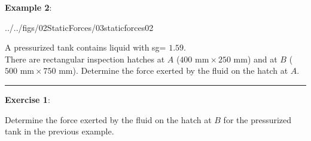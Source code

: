 \documentclass[10pt,onesided]{amsart}
\begin{document}
\begin{minipage}[t]{0.5\textwidth}
	\raggedright
	\textbf{Example 2}:\parb
	\parb
	\begin{cfig}[0.45]{../../figs/02StaticForces/03staticforces02}\end{cfig}
	A pressurized tank contains liquid with sg= $1.59$. \\
	There are rectangular inspection hatches at $A$ ($400\text{ mm}\times 250\text{ mm}$) and at $B$ ($500\text{ mm}\times 750\text{ mm}$).
	\parb
	Determine the force exerted by the fluid on the hatch at $A$.
	\vspace{4cm}
\end{minipage}
\parb
\rule{\textwidth}{0.02in}
\parb

\begin{minipage}[t]{0.5\textwidth}
	\raggedright
	\textbf{Exercise 1}:\parb
	
	Determine the force exerted by the fluid on the hatch at $B$ for the pressurized tank in the previous example.
\end{minipage}
\end{document}
